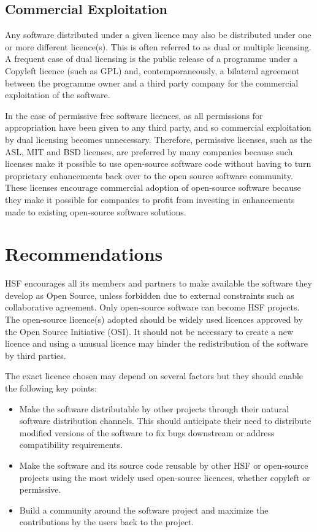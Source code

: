 \documentclass[12pt,a4paper]{article}
\begin{document}
\subsection{Commercial Exploitation}
\label{sec:Commercial Exploitation}

Any software distributed under a given licence may also be distributed under one or more different licence(s). This is often referred to as dual or multiple licensing.  A frequent case of dual licensing is the public release of a programme under a Copyleft licence (such as GPL) and, contemporaneously, a bilateral agreement between the programme owner and a third party company for the commercial exploitation of the software. 

In the case of permissive free software licences, as all permissions for appropriation have been given to any third party, and so commercial exploitation by dual licensing becomes unnecessary. Therefore, permissive licenses, such as the ASL, MIT and BSD licenses, are preferred by many companies because such licenses make it possible to use open-source software code without having to turn proprietary enhancements back over to the open source software community. These licenses encourage commercial adoption of open-source software because they make it possible for companies to profit from investing in enhancements made to existing open-source software solutions.

\section{Recommendations}
\label{sec:Recommendations}

HSF encourages all its members and partners to make available the software they develop as Open Source, unless forbidden due to external constraints such as collaborative agreement. Only open-source software can become HSF projects. The open-source licence(s) adopted should be widely used licences approved by the Open Source Initiative (OSI). It should not be necessary to create a new licence and using a unusual licence may hinder the redistribution of the software by third parties.

The exact licence chosen may depend on several factors but they should enable the following key points:
\begin{itemize}	
\item Make the software distributable by other projects through their natural software distribution channels. This should anticipate their need to distribute modified versions of the software to fix bugs downstream or address compatibility requirements. 
\item Make the software and its source code reusable by other HSF or open-source projects using the most widely used open-source licences, whether copyleft or permissive.
\item Build a community around the software project and maximize the contributions by the users back to the project.
\end{itemize}
\end{document}
